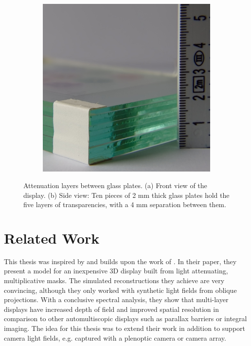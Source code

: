 \begin{figure}
\begin{subfigure}[t]{.49\textwidth}
		\includegraphics[width = \textwidth]{../Figures/hand_craft/glass_plates_side_view_cropped}
		\caption{}
		\label{fig:close_up_of_layers_between_glasses}
	\end{subfigure}
	\caption[Attenuation layers between glass plates]
			{Attenuation layers between glass plates.
			 (a) Front view of the display.
			 (b) Side view: Ten pieces of 2 mm thick glass plates hold the five layers of transparencies, with a 4 mm separation between them.}
	\label{fig:glass_display}
\end{figure}

\section{Related Work}

This thesis was inspired by and builds upon the work of \cite{WetzsteinTomo}.
In their paper, they present a model for an inexpensive 3D display built from light attenuating, multiplicative masks.
The simulated reconstructions they achieve are very convincing, although they only worked with synthetic light fields from oblique projections.
With a conclusive spectral analysis, they show that multi-layer displays have increased depth of field and improved spatial resolution in comparison to other automultiscopic displays such as parallax barriers or integral imaging.
The idea for this thesis was to extend their work in addition to support camera light fields, e.g. captured with a plenoptic camera or camera array.

